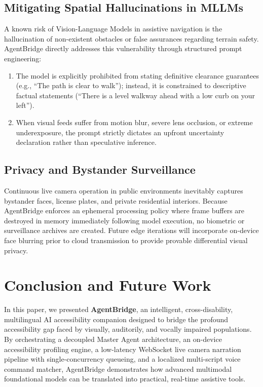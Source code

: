 \documentclass[10pt,a4paper]{article}
\begin{document}
\subsection{Mitigating Spatial Hallucinations in MLLMs}
A known risk of Vision-Language Models in assistive navigation is the hallucination of non-existent obstacles or false assurances regarding terrain safety. AgentBridge directly addresses this vulnerability through structured prompt engineering:
\begin{enumerate}
    \item The model is explicitly prohibited from stating definitive clearance guarantees (e.g., ``The path is clear to walk''); instead, it is constrained to descriptive factual statements (``There is a level walkway ahead with a low curb on your left'').
    \item When visual feeds suffer from motion blur, severe lens occlusion, or extreme underexposure, the prompt strictly dictates an upfront uncertainty declaration rather than speculative inference.
\end{enumerate}

\subsection{Privacy and Bystander Surveillance}
Continuous live camera operation in public environments inevitably captures bystander faces, license plates, and private residential interiors. Because AgentBridge enforces an ephemeral processing policy where frame buffers are destroyed in memory immediately following model execution, no biometric or surveillance archives are created. Future edge iterations will incorporate on-device face blurring prior to cloud transmission to provide provable differential visual privacy.

\FloatBarrier
\section{Conclusion and Future Work}

In this paper, we presented \textbf{AgentBridge}, an intelligent, cross-disability, multilingual AI accessibility companion designed to bridge the profound accessibility gap faced by visually, auditorily, and vocally impaired populations. By orchestrating a decoupled Master Agent architecture, an on-device accessibility profiling engine, a low-latency WebSocket live camera narration pipeline with single-concurrency queueing, and a localized multi-script voice command matcher, AgentBridge demonstrates how advanced multimodal foundational models can be translated into practical, real-time assistive tools.
\end{document}
